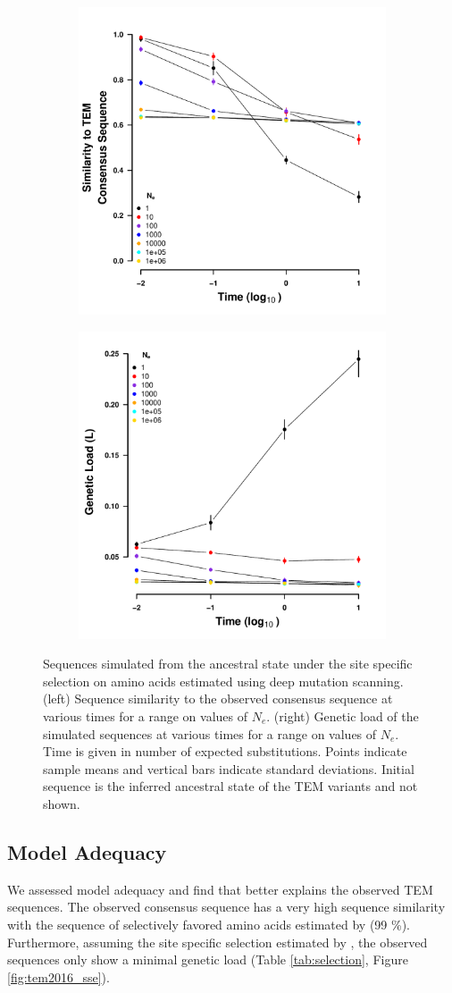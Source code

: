 \documentclass[12pt]{article}
\begin{document}
\begin{figure}[h]
    \centering
    \begin{subfigure}
        \centering
        \includegraphics[width=.45\textwidth]{img/simulated_dist_time_DMS_ancest.pdf}
    \end{subfigure}
    \begin{subfigure}
        \centering
        \includegraphics[width=.45\textwidth]{img/simulated_gl_time_DMS_ancest.pdf}
    \end{subfigure}
    \caption{Sequences simulated from the ancestral state under the site specific selection on amino acids estimated using deep mutation scanning. 
    (left) Sequence similarity to the observed consensus sequence at various times for a range on values of $N_e$.
    (right) Genetic load of the simulated sequences at various times for a range on values of $N_e$.
    Time is given in number of expected substitutions.
    Points indicate sample means and vertical bars indicate standard deviations. Initial sequence is the inferred ancestral state of the TEM variants and not shown.}
    \label{fig:dms_sim}
\end{figure}

\subsection*{\selac Model Adequacy} 
We assessed model adequacy and find that \selac better explains the observed TEM sequences.
The observed consensus sequence has a very high sequence similarity with the sequence of selectively favored amino acids estimated by \selac (99 \%).
Furthermore, assuming the site specific selection estimated by \selac, the observed sequences only show a minimal genetic load (Table \ref{tab:selection}, Figure \ref{fig:tem2016_sse}).
\end{document}
